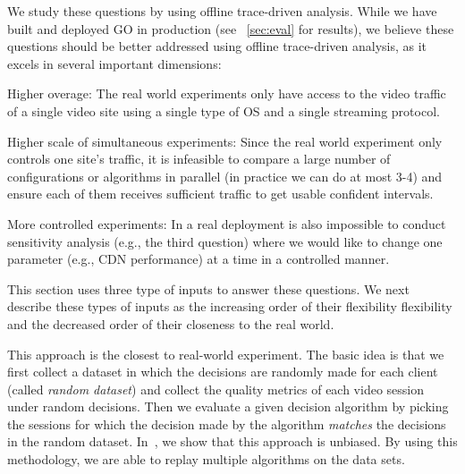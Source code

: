 We study these questions by using offline trace-driven analysis. While we have built and deployed GO in production (see \Section~\ref{sec:eval} for results), we believe these questions should be better addressed using offline trace-driven analysis, as it excels in several important dimensions:
\begin{packedenumerate}
	\item Higher overage: The real world experiments only have access to the video traffic of a single video site using a single type of OS and a single streaming protocol. %
	\item Higher scale of simultaneous experiments: Since the real world experiment only controls one site's traffic, it is infeasible to compare a large number of configurations or algorithms in parallel (in practice we can do at most 3-4) and ensure each of them receives sufficient traffic to get usable confident intervals.
	\item More controlled experiments: In a real deployment is also impossible to conduct sensitivity analysis (e.g., the third question) where we would like to change one parameter (e.g., CDN performance) at a time in a controlled manner.
\end{packedenumerate}


This section uses three type of inputs to answer these questions. We next describe these types of inputs as the increasing order of their flexibility flexibility and the decreased order of their closeness to the real world.

 This approach is the closest to
real-world experiment. The basic idea is that we first collect a
dataset in which the decisions are randomly made for each client
(called {\it random dataset}) and collect the quality metrics of each
video session under random decisions. Then we evaluate a given
decision algorithm by picking the sessions for which the decision made
by the algorithm \emph{matches} the decisions in the random
dataset. In~\cite{technicalreport}, we show that this approach is
unbiased.  By using this methodology, we are able to replay multiple
algorithms on the data sets.

